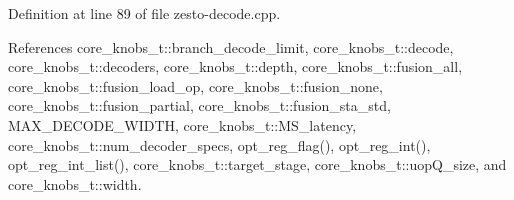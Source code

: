 Definition at line 89 of file zesto-decode.cpp.

References core\_\-knobs\_\-t::branch\_\-decode\_\-limit, core\_\-knobs\_\-t::decode, core\_\-knobs\_\-t::decoders, core\_\-knobs\_\-t::depth, core\_\-knobs\_\-t::fusion\_\-all, core\_\-knobs\_\-t::fusion\_\-load\_\-op, core\_\-knobs\_\-t::fusion\_\-none, core\_\-knobs\_\-t::fusion\_\-partial, core\_\-knobs\_\-t::fusion\_\-sta\_\-std, MAX\_\-DECODE\_\-WIDTH, core\_\-knobs\_\-t::MS\_\-latency, core\_\-knobs\_\-t::num\_\-decoder\_\-specs, opt\_\-reg\_\-flag(), opt\_\-reg\_\-int(), opt\_\-reg\_\-int\_\-list(), core\_\-knobs\_\-t::target\_\-stage, core\_\-knobs\_\-t::uopQ\_\-size, and core\_\-knobs\_\-t::width.